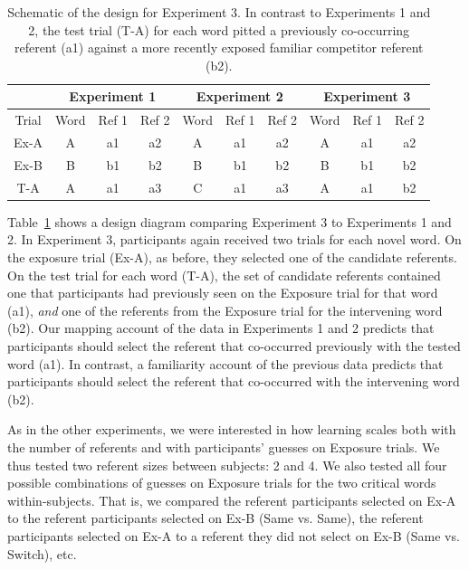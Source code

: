 \documentclass[authoryear,review]{elsarticle}
\begin{document}
\begin{table}[tb]
\begin{center}
\begin{tabular}{| c | c c c | c c c | c c c |}
\multicolumn{1}{c}{ }
 & \multicolumn{3}{c}{Experiment 1}
 & \multicolumn{3}{c}{Experiment 2}
 & \multicolumn{3}{c}{Experiment 3} \\
 \hline
Trial & Word & Ref 1 & Ref 2 & Word & Ref 1 & Ref 2 & Word & Ref 1 & Ref 2 \\ 
\hline
Ex-A& A & a1 & a2 & A & a1 & a2 & A & a1 & a2 \\ 
Ex-B & B & b1 & b2 & B & b1 & b2 & B & b1 & b2 \\ 
T-A & A & a1 & a3 & C & a1 & a3 & A & a1 & b2 \\ 
\hline
\end{tabular}
\end{center}
\vspace{6pt}
\caption{\label{tab:exp3_design}Schematic of the design for Experiment 3. In contrast to Experiments 1 and 2, the test trial (T-A) for each word pitted a previously co-occurring referent (a1) against a more recently exposed familiar competitor referent (b2).}
\end{table}

Table~\ref{tab:exp3_design} shows a design diagram comparing Experiment 3 to Experiments 1 and 2. In Experiment 3, participants again received two trials for each novel word. On the exposure trial (Ex-A), as before, they selected one of the candidate referents. On the test trial for each word (T-A), the set of candidate referents contained one that participants had previously seen on the Exposure trial for that word (a1), \emph{and} one of the referents from the Exposure trial for the intervening word (b2). Our mapping account of the data in Experiments 1 and 2 predicts that participants should select the referent that co-occurred previously with the tested word (a1). In contrast, a familiarity account of the previous data predicts that participants should select the referent that co-occurred with the intervening word (b2).

As in the other experiments, we were interested in how learning scales both with the number of referents and with participants' guesses on Exposure trials. We thus tested two referent sizes between subjects: 2 and 4. We also tested all four possible combinations of guesses on Exposure trials for the two critical words within-subjects. That is, we compared the referent participants selected on Ex-A to the referent participants selected on Ex-B (Same vs. Same), the referent participants selected on Ex-A to a referent they did not select on Ex-B (Same vs. Switch), etc. 
\end{document}
